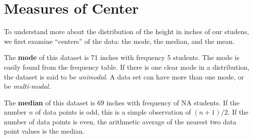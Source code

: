 \documentclass[nohyper,justified]{tufte-handout}\usepackage[]{graphicx}\usepackage[]{color}
\begin{document}
\begin{table}[ht]
\centering
{}
\caption{Frequency Table} 
\end{table}


\section{Measures of Center}


To understand more about the distribution of the height in inches of our studens, we first examine ``centers'' of the data: the mode, the median, and the mean.

The \textbf{mode} of this dataset is 71 inches with frequency 5 students. The mode is easily found from the frequency table. If there is one clear mode in a distribution, the dataset is said to be \textit{unimodal}. A data set can have more than one mode, or be \textit{multi-modal}.

The \textbf{median} of this dataset is 69 inches with frequency of NA students. If the number $n$ of data points is odd, this is a simple observation of $(n+1)/2$. If the number of data points is even, the arithmetic average of the nearest two data point values is the median.
\end{document}
